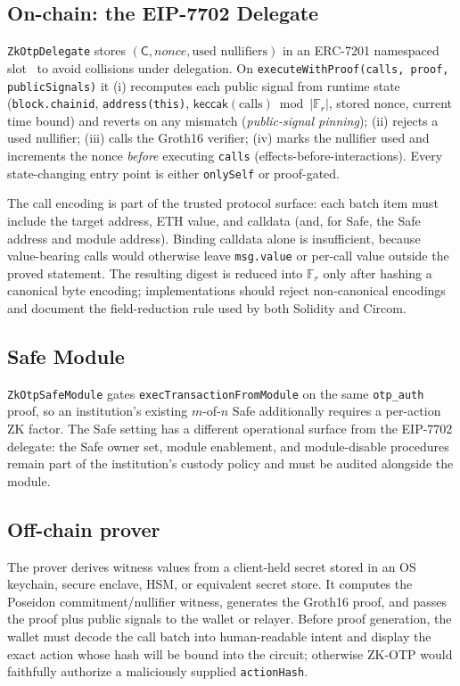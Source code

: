 \documentclass[11pt]{article}
\theoremstyle{definition}
\theoremstyle{plain}
\newcommand{\keccak}{\mathsf{keccak}}
\newcommand{\Fr}{\mathbb{F}_r}       %
\newcommand{\commit}{\mathsf{C}}
\begin{document}
\subsection{On-chain: the EIP-7702 Delegate}
\label{sec:onchain}
\texttt{ZkOtpDelegate} stores $(\commit, \mathit{nonce}, \text{used nullifiers})$ in
an ERC-7201 namespaced slot~\cite{erc7201} to avoid collisions under delegation. On
\texttt{executeWithProof(calls, proof, publicSignals)} it (i) recomputes each public
signal from runtime state (\texttt{block.chainid}, \texttt{address(this)},
$\keccak(\text{calls}) \bmod |\Fr|$, stored nonce, current time bound) and reverts on any
mismatch (\emph{public-signal pinning}); (ii) rejects a used nullifier; (iii) calls
the Groth16 verifier; (iv) marks the nullifier used and increments the nonce
\emph{before} executing \texttt{calls} (effects-before-interactions). Every
state-changing entry point is either \texttt{onlySelf} or proof-gated.

The call encoding is part of the trusted protocol surface: each batch item must
include the target address, ETH value, and calldata (and, for Safe, the Safe address
and module address). Binding calldata alone is insufficient, because value-bearing
calls would otherwise leave \texttt{msg.value} or per-call value outside the proved
statement. The resulting digest is reduced into $\Fr$ only after hashing a canonical
byte encoding; implementations should reject non-canonical encodings and document the
field-reduction rule used by both Solidity and Circom.

\subsection{Safe Module}
\label{sec:safe}
\texttt{ZkOtpSafeModule} gates \texttt{execTransactionFromModule} on the same
\texttt{otp\_auth} proof, so an institution's existing $m$-of-$n$ Safe additionally
requires a per-action ZK factor. The Safe setting has a different operational
surface from the EIP-7702 delegate: the Safe owner set, module enablement, and
module-disable procedures remain part of the institution's custody policy and
must be audited alongside the module.

\subsection{Off-chain prover}
\label{sec:prover}
The prover derives witness values from a client-held secret stored in an OS
keychain, secure enclave, HSM, or equivalent secret store. It computes the
Poseidon commitment/nullifier witness, generates the Groth16 proof, and passes
the proof plus public signals to the wallet or relayer. Before proof generation,
the wallet must decode the call batch into human-readable intent and display the
exact action whose hash will be bound into the circuit; otherwise ZK-OTP would
faithfully authorize a maliciously supplied \texttt{actionHash}.
\end{document}
